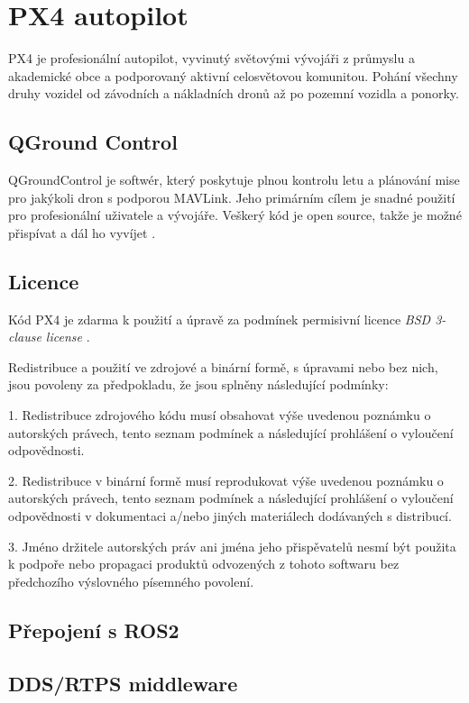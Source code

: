 \chapter{PX4 autopilot}

PX4 je profesionální autopilot, vyvinutý světovými vývojáři z průmyslu a akademické obce a podporovaný aktivní celosvětovou komunitou. Pohání všechny druhy vozidel od závodních a nákladních dronů až po pozemní vozidla a ponorky. 

\section{QGround Control}

QGroundControl je softwér, který poskytuje plnou kontrolu letu a plánování mise pro jakýkoli dron s podporou MAVLink. Jeho primárním cílem je snadné použití pro profesionální uživatele a vývojáře. Veškerý kód je open source, takže je možné přispívat a dál ho vyvíjet \cite{QGround}.

\section{Licence}

Kód PX4 je zdarma k použití a úpravě za podmínek permisivní licence \textit{BSD 3-clause license} \cite{BSDlicense}.

Redistribuce a použití ve zdrojové a binární formě, s úpravami nebo bez nich, jsou povoleny za předpokladu, že jsou splněny následující podmínky:

1. Redistribuce zdrojového kódu musí obsahovat výše uvedenou poznámku o autorských právech, tento seznam podmínek a následující prohlášení o vyloučení odpovědnosti.

2. Redistribuce v binární formě musí reprodukovat výše uvedenou poznámku o autorských právech, tento seznam podmínek a následující prohlášení o vyloučení odpovědnosti v dokumentaci a/nebo jiných materiálech dodávaných s distribucí.

3. Jméno držitele autorských práv ani jména jeho přispěvatelů nesmí být použita k podpoře nebo propagaci produktů odvozených z tohoto softwaru bez předchozího výslovného písemného povolení.

\section{Přepojení s ROS2}

\section{DDS/RTPS middleware}


